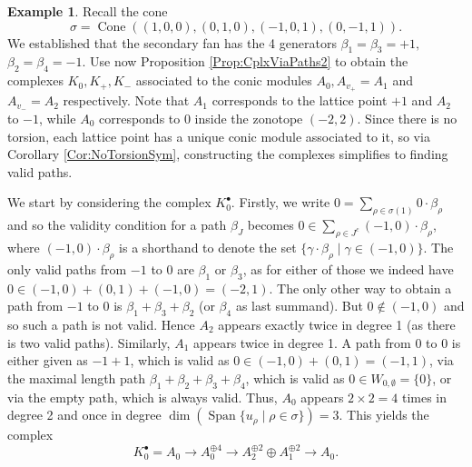 \documentclass[reqno, 12pt]{amsart}
\theoremstyle{definition}
\newtheorem{example}[theorem]{Example}
\numberwithin{equation}{section}
\newcommand{\cone}{\operatorname{Cone}}
\begin{document}
\begin{example}
Recall the cone \[\sigma=\cone((1,0,0),(0,1,0),(-1,0,1),(0,-1,1)).\] We established that the secondary fan has the 4 generators $\beta_1=\beta_3=+1,$ $\beta_2=\beta_4=-1$. Use now Proposition \ref{Prop:CplxViaPaths2} to obtain the complexes $K_0, K_{+}, K_{-}$ associated to the conic modules $A_0, A_{v_+}=A_1$ and $A_{v_-}=A_2$ respectively. Note that $A_{1}$ corresponds to the lattice point $+1$ and $A_{2}$ to $-1$, while $A_0$ corresponds to $0$ inside the zonotope $(-2,2)$.
Since there is no torsion, each lattice point has a unique conic module associated to it, so via Corollary \ref{Cor:NoTorsionSym}, constructing the complexes simplifies to finding valid paths.

We start by considering the complex $K_0^\bullet$. Firstly, we write $0=\sum_{\rho\in \sigma(1)}0\cdot \beta_\rho$ and so the validity condition for a path $\beta_J$ becomes $0\in \sum_{\rho\in J^c}(-1,0)\cdot\beta_\rho$, where $(-1,0)\cdot\beta_\rho$ is a shorthand to denote the set $\{\gamma\cdot \beta_\rho\mid \gamma\in (-1,0)\}$. The only valid paths from $-1$ to $0$ are $\beta_1$ or $\beta_3$, as for either of those we indeed have $0\in (-1,0)+(0,1)+(-1,0)=(-2,1)$. The only other way to obtain a path from $-1$ to $0$ is $\beta_1+\beta_3+\beta_2$ (or $\beta_4$ as last summand). But $0\not\in (-1,0)$ and so such a path is not valid. Hence $A_{2}$ appears exactly twice in degree 1 (as there is two valid paths). Similarly, $A_{1}$ appears twice in degree 1. A path from $0$ to $0$ is either given as $-1+1$, which is valid as $0\in (-1,0)+(0,1)=(-1,1)$, via the maximal length path $\beta_1+\beta_2+\beta_3+\beta_4$, which is valid as $0\in W_{0,\emptyset}=\{0\}$, or via the empty path, which is always valid. 
Thus, $A_0$ appears $2\times 2=4$ times in degree 2 and once in degree $\dim(\operatorname{Span}\{u_\rho\mid \rho\in \sigma\})=3$. This yields the complex \[
K_0^\bullet= A_0\rightarrow A_0^{\oplus 4}\rightarrow A_{2}^{\oplus 2}\oplus A_{1}^{\oplus2}\rightarrow A_0.
\] 



\end{example}
\end{document}
